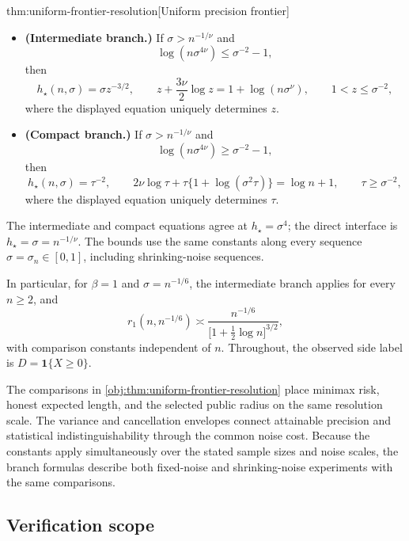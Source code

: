 \begin{propositionv}{thm:uniform-frontier-resolution}[Uniform precision frontier]
\begin{itemize}
\item \textbf{(Intermediate branch.)}
If \(\sigma>n^{-1/\nu}\) and
\[
\log(n\sigma^{4\nu})\le \sigma^{-2}-1,
\]
then
\[
h_\star(n,\sigma)=\sigma z^{-3/2},
\qquad
z+\frac{3\nu}{2}\log z=1+\log(n\sigma^\nu),
\qquad
1<z\le\sigma^{-2},
\]
where the displayed equation uniquely determines \(z\).

\item \textbf{(Compact branch.)}
If \(\sigma>n^{-1/\nu}\) and
\[
\log(n\sigma^{4\nu})\ge \sigma^{-2}-1,
\]
then
\[
h_\star(n,\sigma)=\tau^{-2},
\qquad
2\nu\log\tau+
\tau\bigl\{1+\log(\sigma^2\tau)\bigr\}=\log n+1,
\qquad
\tau\ge\sigma^{-2},
\]
where the displayed equation uniquely determines \(\tau\).
\end{itemize}
The intermediate and compact equations agree at
\(h_\star=\sigma^4\); the direct interface is
\(h_\star=\sigma=n^{-1/\nu}\). The bounds use the same constants along every sequence \(\sigma=\sigma_n\in[0,1]\), including shrinking-noise sequences.

In particular, for \(\beta=1\) and \(\sigma=n^{-1/6}\), the intermediate branch applies for every \(n\ge2\), and
\[
r_1(n,n^{-1/6})
\asymp
\frac{n^{-1/6}}{\bigl[1+\tfrac12\log n\bigr]^{3/2}},
\]
with comparison constants independent of \(n\). Throughout, the observed side label is \(D=\mathbf1\{X\ge0\}\).
\end{propositionv}

The comparisons in \cref{obj:thm:uniform-frontier-resolution} place minimax risk, honest expected length, and the selected public radius on the same resolution scale. The variance and cancellation envelopes connect attainable precision and statistical indistinguishability through the common noise cost. Because the constants apply simultaneously over the stated sample sizes and noise scales, the branch formulas describe both fixed-noise and shrinking-noise experiments with the same comparisons.

\subsection{Verification scope}

